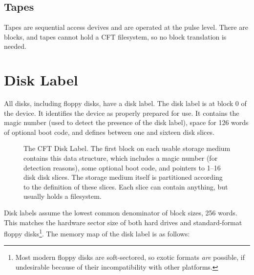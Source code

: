 \subsection{Tapes}

Tapes are sequential access devives and are operated at the pulse level. There
are blocks, and tapes cannot hold a CFT filesystem, so no block translation is
needed.

\section{Disk Label}
\label{sec:disk-label}
\label{sec:disklabel}
\label{sec:disk-slices}

All disks, including floppy disks, have a \gls{disk label}. The disk
label is at block 0 of the device. It identifies the device as
properly prepared for use. It contains the magic number
\magicDiskLabel (used to detect the presence of the disk label), space
for 126 words of optional boot code, and defines between one and
sixteen \glspl{disk slice}.

\begin{figure}
 \centering

 \caption[Disk Label]{\label{fig:storage-medium-organisation} The CFT
   Disk Label. The first block on each usable storage medium contains
   this data structure, which includes a magic number (for detection
   reasons), some optional boot code, and pointers to 1–16 disk
   \glspl{disk slice}. The storage medium itself is partitioned
   according to the definition of these slices. Each slice can contain
   anything, but usually holds a \gls{filesystem}.}
\end{figure}

Disk labels assume the lowest common denominator of block sizes, 256
words. This matches the hardware sector size of both hard drives and
standard-format floppy disks\footnote{Most modern floppy disks are
  soft-sectored, so exotic formats {\em are\/} possible, if undesirable
  because of their incompatibility with other platforms.}. The memory
map of the disk label is as follows:

